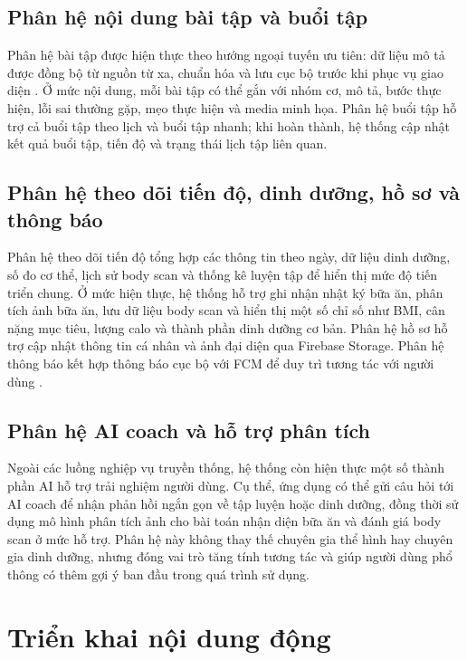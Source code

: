 \subsection{Phân hệ nội dung bài tập và buổi tập}

Phân hệ bài tập được hiện thực theo hướng ngoại tuyến ưu tiên: dữ liệu mô tả được đồng bộ từ nguồn từ xa, chuẩn hóa và lưu cục bộ trước khi phục vụ giao diện \cite{firebase_firestore,android_room,android_workmanager}. Ở mức nội dung, mỗi bài tập có thể gắn với nhóm cơ, mô tả, bước thực hiện, lỗi sai thường gặp, mẹo thực hiện và media minh họa. Phân hệ buổi tập hỗ trợ cả buổi tập theo lịch và buổi tập nhanh; khi hoàn thành, hệ thống cập nhật kết quả buổi tập, tiến độ và trạng thái lịch tập liên quan.

\subsection{Phân hệ theo dõi tiến độ, dinh dưỡng, hồ sơ và thông báo}

Phân hệ theo dõi tiến độ tổng hợp các thông tin theo ngày, dữ liệu dinh dưỡng, số đo cơ thể, lịch sử body scan và thống kê luyện tập để hiển thị mức độ tiến triển chung. Ở mức hiện thực, hệ thống hỗ trợ ghi nhận nhật ký bữa ăn, phân tích ảnh bữa ăn, lưu dữ liệu body scan và hiển thị một số chỉ số như BMI, cân nặng mục tiêu, lượng calo và thành phần dinh dưỡng cơ bản. Phân hệ hồ sơ hỗ trợ cập nhật thông tin cá nhân và ảnh đại diện qua Firebase Storage. Phân hệ thông báo kết hợp thông báo cục bộ với FCM để duy trì tương tác với người dùng \cite{firebase_storage,firebase_fcm}.

\subsection{Phân hệ AI coach và hỗ trợ phân tích}

Ngoài các luồng nghiệp vụ truyền thống, hệ thống còn hiện thực một số thành phần AI hỗ trợ trải nghiệm người dùng. Cụ thể, ứng dụng có thể gửi câu hỏi tới AI coach để nhận phản hồi ngắn gọn về tập luyện hoặc dinh dưỡng, đồng thời sử dụng mô hình phân tích ảnh cho bài toán nhận diện bữa ăn và đánh giá body scan ở mức hỗ trợ. Phân hệ này không thay thế chuyên gia thể hình hay chuyên gia dinh dưỡng, nhưng đóng vai trò tăng tính tương tác và giúp người dùng phổ thông có thêm gợi ý ban đầu trong quá trình sử dụng.

\section{Triển khai nội dung động}

